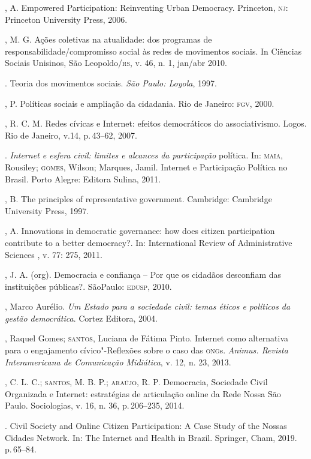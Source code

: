 \begin{bibliohedra}
, A. Empowered Participation: Reinventing Urban Democracy.
Princeton, \textsc{nj}: Princeton University Press, 2006.

, M. G. Ações coletivas na atualidade: dos programas de
responsabilidade/compromisso social às redes de movimentos sociais. In
Ciências Sociais Unisinos, São Leopoldo/\textsc{rs}, v. 46, n. 1, jan/abr 2010.

\titidem. Teoria dos movimentos sociais. \emph{São Paulo:
Loyola}, 1997.

, P. Políticas sociais e ampliação da cidadania. Rio de Janeiro:
\textsc{fgv}, 2000.

, R. C. M. Redes cívicas e Internet: efeitos democráticos do
associativismo. Logos. Rio de Janeiro, v.14, p.\,43--62, 2007.

\titidem. \emph{Internet e esfera civil: limites e alcances da
participação} política. In: \textsc{maia}, Rousiley; \textsc{gomes}, Wilson; Marques,
Jamil. Internet e Participação Política no Brasil. Porto Alegre: Editora
Sulina, 2011.

, B. The principles of representative government. Cambridge:
Cambridge University Press, 1997.

, A. Innovations in democratic governance: how does citizen
participation contribute to a better democracy?. In: International
Review of Administrative Sciences , v. 77: 275, 2011.

, J. A. (org). Democracia e confiança -- Por que os cidadãos
desconfiam das instituições públicas?. SãoPaulo: \textsc{edusp}, 2010.

, Marco Aurélio. \emph{Um Estado para a sociedade civil: temas
éticos e políticos da gestão democrática}. Cortez Editora, 2004.

, Raquel Gomes; \textsc{santos}, Luciana de Fátima Pinto. Internet como
alternativa para o engajamento cívico"-Reflexões sobre o caso das \textsc{ong}s.
\emph{Animus. Revista Interamericana de Comunicação Midiática}, v. 12,
n. 23, 2013.

, C. L. C.; \textsc{santos}, M. B. P.; \textsc{araújo}, R. P. Democracia,
Sociedade Civil Organizada e Internet: estratégias de articulação online
da Rede Nossa São Paulo. Sociologias, v. 16, n. 36, p.\,206--235, 2014.

\titidem. Civil Society and Online Citizen Participation:
A Case Study of the Nossas Cidades Network. In: The Internet and Health
in Brazil. Springer, Cham, 2019. p.\,65--84.


\end{bibliohedra}
